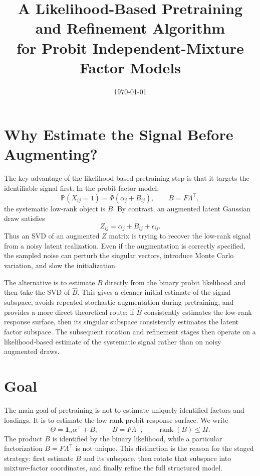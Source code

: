 \documentclass[11pt]{article}
\title{A Likelihood-Based Pretraining and Refinement Algorithm\\
for Probit Independent-Mixture Factor Models}
\author{}
\date{\today}
\newcommand{\Prob}{\mathbb{P}}
\newcommand{\rank}{\operatorname{rank}}
\newcommand{\PhiN}{\Phi}
\begin{document}
\maketitle

\section{Why Estimate the Signal Before Augmenting?}

The key advantage of the likelihood-based pretraining step is that it targets
the identifiable signal first.  In the probit factor model,
\[
  \Prob(X_{ij}=1)=\PhiN(\alpha_j+B_{ij}),
  \qquad
  B=F\Lambda^\top,
\]
the systematic low-rank object is \(B\).  By contrast, an augmented latent
Gaussian draw satisfies
\[
  Z_{ij}=\alpha_j+B_{ij}+\epsilon_{ij}.
\]
Thus an SVD of an augmented \(Z\) matrix is trying to recover the low-rank
signal from a noisy latent realization.  Even if the augmentation is correctly
specified, the sampled noise can perturb the singular vectors, introduce
Monte Carlo variation, and slow the initialization.

The alternative is to estimate \(B\) directly from the binary probit
likelihood and then take the SVD of \(\widehat B\).  This gives a cleaner
initial estimate of the signal subspace, avoids repeated stochastic
augmentation during pretraining, and provides a more direct theoretical route:
if \(\widehat B\) consistently estimates the low-rank response surface, then
its singular subspace consistently estimates the latent factor subspace.  The
subsequent rotation and refinement stages then operate on a likelihood-based
estimate of the systematic signal rather than on noisy augmented draws.

\section{Goal}

The main goal of pretraining is not to estimate uniquely identified factors
and loadings.  It is to estimate the low-rank probit response surface.  We
write
\[
  \Theta = \bm 1_n\alpha^\top + B,
  \qquad
  B=F\Lambda^\top,\qquad \rank(B)\leq H.
\]
The product \(B\) is identified by the binary likelihood, while a particular
factorization \(B=F\Lambda^\top\) is not unique.  This distinction is the
reason for the staged strategy: first estimate \(B\) and its subspace, then
rotate that subspace into mixture-factor coordinates, and finally refine the
full structured model.
\end{document}
